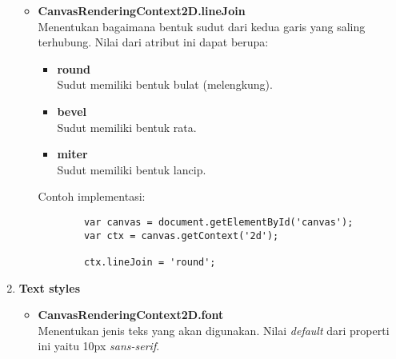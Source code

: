 \begin{enumerate}
\begin{itemize}
		\item \textbf{CanvasRenderingContext2D.lineJoin} \\ Menentukan bagaimana bentuk sudut dari kedua garis yang saling terhubung. Nilai dari atribut ini dapat berupa:
		\begin{itemize}
			\item \textbf{round} \\ Sudut memiliki bentuk bulat (melengkung).
			\item \textbf{bevel} \\ Sudut memiliki bentuk rata.
			\item \textbf{miter} \\ Sudut memiliki bentuk lancip.
		\end{itemize}
		Contoh implementasi:
		\begin{lstlisting}
		var canvas = document.getElementById('canvas');
		var ctx = canvas.getContext('2d');
		
		ctx.lineJoin = 'round';
		\end{lstlisting}
	\end{itemize}

	\item \textbf{Text styles} 
	\begin{itemize}
		\item \textbf{CanvasRenderingContext2D.font} \\ Menentukan jenis teks yang akan digunakan. Nilai \textit{default} dari properti ini yaitu 10px \textit{sans-serif}.
	\end{itemize}
	
\end{enumerate}

